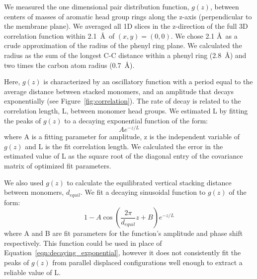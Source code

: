 \documentclass[journal=jpcbfk,manuscript=article]{achemso}
\begin{document}
  We measured the one dimensional pair distribution function, $g(z)$, between centers 
  of masses of aromatic head group rings along the z-axis (perpendicular to
  the membrane plane). We averaged all 1D slices in the z-direction of the full 3D 
  correlation function within 2.1~\AA~of $(x, y)=(0, 0)$. We chose 2.1 \AA~as a crude 
  approximation of the radius of the phenyl ring plane. 
  We calculated the radius as the sum of the longest C-C distance within a phenyl 
  ring (2.8~\AA) and two times the carbon atom radius (0.7~\AA).
  
  Here, $g(z)$ is characterized by an oscillatory function with a period equal to the
  average distance between stacked monomers, and an amplitude that decays exponentially
  (see Figure~\ref{fig:correlation}). The rate of decay is related to the correlation 
  length, L, between monomer head groups. We estimated L by fitting the peaks of $g(z)$
  to a decaying exponential function of the form:
  \begin{equation}
  	Ae^{-z/L}
  	\label{eqn:decaying_exponential}
  \end{equation}
  where A is a fitting parameter for amplitude, z is the independent variable of $g(z)$ 
  and L is the fit correlation length. We calculated the error in the estimated value
  of L as the square root of the diagonal entry of the covariance matrix of 
  optimized fit parameters.  %
  
  We also used $g(z)$ to calculate the equilibrated vertical stacking distance between
  monomers, $d_{equil}$. 
  We fit a decaying sinusoidal function to $g(z)$ of the form:
  \begin{equation}
  	1 - A\cos\left(\frac{2\pi}{\mathit{d}_{equil}}z + B\right)e^{-z/L}
  	\label{eqn:decaying_sinusoid}
  \end{equation}
  where A and B are fit parameters for the function's amplitude and phase shift respectively.
  This function could be used in place of Equation~\ref{eqn:decaying_exponential}, however
  it does not consistently fit the peaks of $g(z)$ from parallel displaced configurations 
  well enough to extract a reliable value of L.
\end{document}
